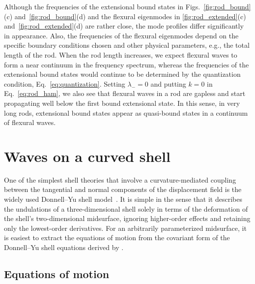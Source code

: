 Although the frequencies of the extensional bound states in Figs.~\ref{fig:rod_bound}(c) and~\ref{fig:rod_bound}(d) and the flexural eigenmodes in \ref{fig:rod_extended}(c) and~\ref{fig:rod_extended}(d) are rather close, the mode profiles differ significantly in appearance.
Also, the frequencies of the flexural eigenmodes depend on the specific boundary conditions chosen and other physical parameters, e.g., the total length of the rod.
When the rod length increases, we expect flexural waves to form a near continuum in the frequency spectrum, whereas the frequencies of the extensional bound states would continue to be determined by the quantization condition, Eq.~\eqref{eq:quantization}.
Setting $\lambda_{-} = 0$ and putting $k = 0$ in Eq.~\eqref{eq:rod_ham}, we also see that flexural waves in a rod are gapless and start propagating well below the first bound extensional state.
In this sense, in very long rods, extensional bound states appear as quasi-bound states in a continuum of flexural waves.

\section{Waves on a curved shell}
\label{sec:shell}

One of the simplest shell theories that involve a curvature-mediated coupling between the tangential and normal components of the displacement field is the widely used Donnell--Yu shell model~\cite{donnell1933,yu1955}.
It is simple in the sense that it describes the undulations of a three-dimensional shell solely in terms of the deformation of the shell's two-dimensional midsurface, ignoring higher-order effects and retaining only the lowest-order derivatives.
For an arbitrarily parameterized midsurface, it is easiest to extract the equations of motion from the covariant form of the Donnell--Yu shell equations derived by \citet{pierce1993a,pierce1993}.

\subsection{Equations of motion}

